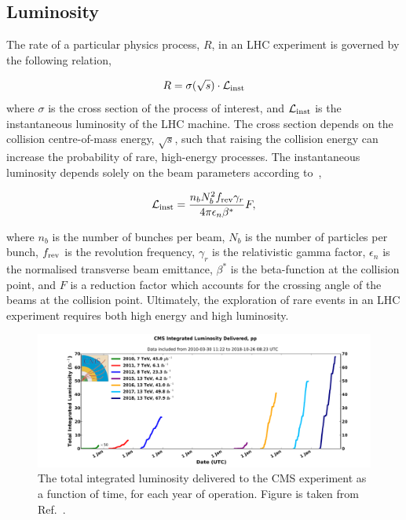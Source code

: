 \subsection{Luminosity}
The rate of a particular physics process, $R$, in an LHC experiment is governed by the following relation,

\begin{equation}\label{eq:lumi_rate}
    R = \sigma(\sqrt{s}) \cdot \mathcal{L}_{\rm{inst}}
\end{equation}
\noindent
where $\sigma$ is the cross section of the process of interest, and $\mathcal{L}_{\rm{inst}}$ is the instantaneous luminosity of the LHC machine. The cross section depends on the collision centre-of-mass energy, $\sqrt{s}$, such that raising the collision energy can increase the probability of rare, high-energy processes. The instantaneous luminosity depends solely on the beam parameters according to~\cite{1748-0221-3-08-S08001},

\begin{equation}\label{eq:inst_lumi}
    \mathcal{L}_{\rm{inst}} = \frac{n_bN_b^2f_{\rm{rev}}\gamma_r}{4\pi\epsilon_n\beta^*}F,
\end{equation}

\noindent
where $n_b$ is the number of bunches per beam, $N_b$ is the number of particles per bunch, $f_{\rm{rev}}$ is the revolution frequency, $\gamma_r$ is the relativistic gamma factor, $\epsilon_n$ is the normalised transverse beam emittance, $\beta^*$ is the beta-function at the collision point, and $F$ is a reduction factor which accounts for the crossing angle of the beams at the collision point. Ultimately, the exploration of rare events in an LHC experiment requires both high energy and high luminosity.

\begin{figure}[htb!]
  \centering
  \includegraphics[width=1\textwidth]{Figures/cms/luminosity.pdf}
  \caption[The total integrated luminosity delivered to the CMS experiment]
  {
    The total integrated luminosity delivered to the CMS experiment as a function of time, for each year of operation.
    Figure is taken from Ref.~\cite{CMSLumiPublic}.
  }
  \label{fig:luminosity}
\end{figure}

